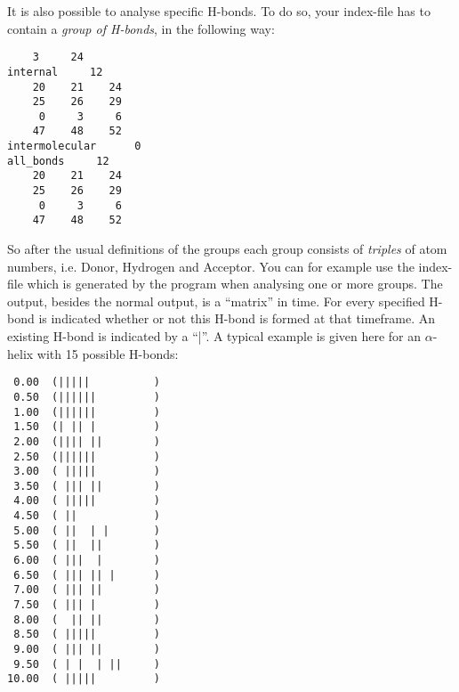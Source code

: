 It is also possible to analyse specific H-bonds. To do so, your index-file has 
to contain a {\em group of H-bonds}, in the following way:
\begin{verbatim}
    3     24
internal     12 
    20    21    24
    25    26    29
     0     3     6
    47    48    52
intermolecular      0 
all_bonds     12 
    20    21    24
    25    26    29
     0     3     6
    47    48    52
\end{verbatim}
So after the usual definitions of the groups each group consists of 
{\em triples} of atom numbers, i.e. Donor, Hydrogen and Acceptor. 
You can for example use the index-file which is generated by the program when 
analysing one or more groups. The output, besides the normal output, is a 
``matrix'' in time. For every specified H-bond is indicated whether or not 
this H-bond is formed at that timeframe. An existing H-bond is indicated by 
a ``|''. A typical example is given here for an $\alpha$-helix with 15 
possible H-bonds:
{\small 
\begin{verbatim} 
 0.00  (|||||          )
 0.50  (||||||         )
 1.00  (||||||         )
 1.50  (| || |         )
 2.00  (|||| ||        )
 2.50  (||||||         )
 3.00  ( |||||         )
 3.50  ( ||| ||        )
 4.00  ( |||||         )
 4.50  ( ||            )
 5.00  ( ||  | |       )
 5.50  ( ||  ||        )
 6.00  ( |||  |        )
 6.50  ( ||| || |      )
 7.00  ( ||| ||        )
 7.50  ( ||| |         )
 8.00  (  || ||        )
 8.50  ( |||||         )
 9.00  ( ||| ||        )
 9.50  ( | |  | ||     )
10.00  ( |||||         )
\end{verbatim} }

